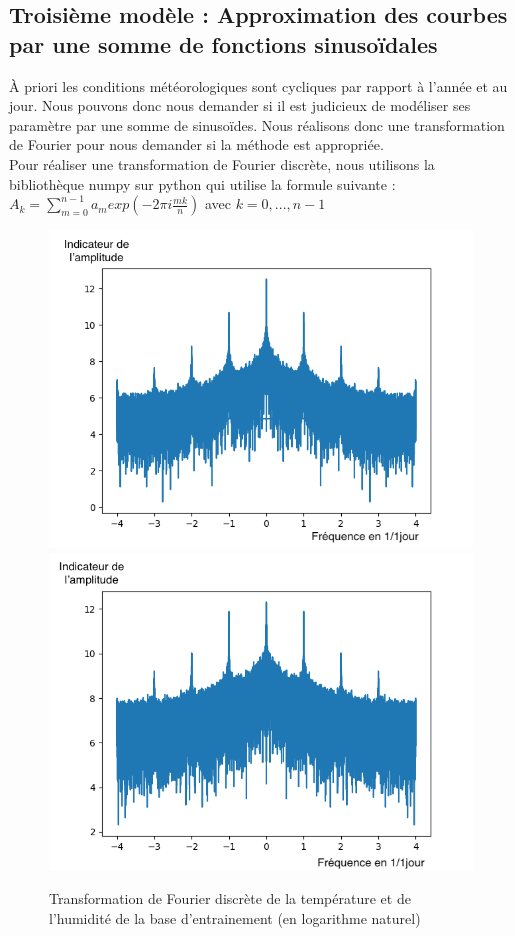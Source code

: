 \documentclass[11pt,a4paper]{article}
\begin{document}
\subsection{Troisième modèle : Approximation des courbes par une somme de fonctions sinusoïdales}
À priori les conditions météorologiques sont cycliques par rapport à l'année et au jour. Nous pouvons donc nous demander si il est judicieux de modéliser ses paramètre par une somme de sinusoïdes. Nous réalisons donc une
transformation de Fourier pour nous demander si la méthode est appropriée. \\
Pour réaliser une transformation de Fourier discrète, nous utilisons la bibliothèque numpy sur python qui utilise la formule suivante :  \\
$ A_{k}  = \displaystyle { \sum_{m=0}^{n-1}} a_{m} exp(-2\pi i \frac{mk}{n} ) $ avec $k = 0, ... , n-1 $   \\ 
\vspace {0.3cm}
\begin{figure} [!h]
\centering
\includegraphics[width=0.48 \textwidth]{./imagesTIPE/fftT.png}\quad
\includegraphics[width=0.48 \textwidth]{./imagesTIPE/fftH.png}
\caption{\label{fig:ffta} Transformation de Fourier discrète de la température et de l'humidité de la base d'entrainement (en logarithme naturel)}
\end{figure}
\end{document}
